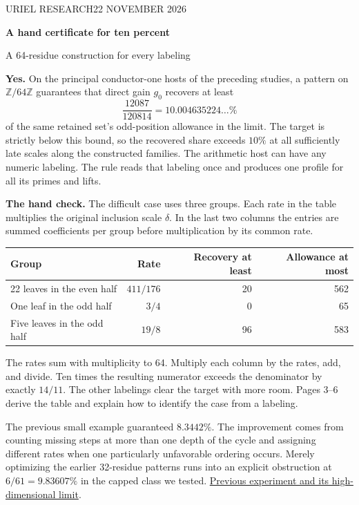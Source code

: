 \documentclass[12pt,letterpaper]{article}
\newcommand{\para}[1]{\par\medskip\noindent\textbf{#1}\quad}
\begin{document}
\thispagestyle{plain}
{\sffamily\small\color{accent}URIEL RESEARCH\hfill 22 NOVEMBER 2026}\par\vspace{14pt}
{\Huge\bfseries\color{ink}A hand certificate for ten percent\par}\vspace{7pt}
{\Large\color{muted}A 64-residue construction for every labeling}\par\bigskip

\textbf{Yes.} On the principal conductor-one hosts of the preceding studies, a pattern on \(\mathbb Z/64\mathbb Z\) guarantees that direct gain \(g_0\) recovers at least
\[
                 \frac{12087}{120814}=10.004635224\ldots\%
\]
of the same retained set's odd-position allowance in the limit. The target is strictly below this bound, so the recovered share exceeds \(10\%\) at all sufficiently late scales along the constructed families. The arithmetic host can have any numeric labeling. The rule reads that labeling once and produces one profile for all its primes and lifts.

\para{The hand check.} The difficult case uses three groups. Each rate in the table multiplies the original inclusion scale \(\delta\). In the last two columns the entries are summed coefficients per group before multiplication by its common rate.
\begin{center}\begin{tabular}{@{}lrrr@{}}\toprule
Group & Rate & Recovery at least & Allowance at most\\\midrule
22 leaves in the even half & \(411/176\) & 20 & 562\\
One leaf in the odd half & \(3/4\) & 0 & 65\\
Five leaves in the odd half & \(19/8\) & 96 & 583\\\bottomrule
\end{tabular}\end{center}
The rates sum with multiplicity to 64. Multiply each column by the rates, add, and divide. Ten times the resulting numerator exceeds the denominator by exactly \(14/11\). The other labelings clear the target with more room. Pages 3--6 derive the table and explain how to identify the case from a labeling.

The previous small example guaranteed \(8.3442\%\). The improvement comes from counting missing steps at more than one depth of the cycle and assigning different rates when one particularly unfavorable ordering occurs. Merely optimizing the earlier 32-residue patterns runs into an explicit obstruction at \(6/61=9.83607\%\) in the capped class we tested. \href{https://github.com/nousentllc/riemann-hypothesis/pull/13}{Previous experiment and its high-dimensional limit}.
\end{document}
